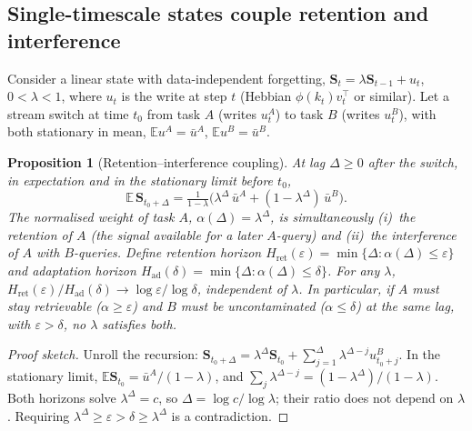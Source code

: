 \documentclass[11pt]{article}
\newtheorem{proposition}{Proposition}
\theoremstyle{remark}
\newcommand{\Sm}{\mathbf{S}}
\begin{document}
\subsection{Single-timescale states couple retention and interference}
\label{sec:coupling}

Consider a linear state with data-independent forgetting, $\Sm_t=\lambda\Sm_{t-1}+u_t$, $0<\lambda<1$, where $u_t$
is the write at step $t$ (Hebbian $\phi(k_t)v_t^\top$ or similar). Let a stream switch at time $t_0$ from task $A$
(writes $u^A_t$) to task $B$ (writes $u^B_t$), with both stationary in mean, $\mathbb{E}u^A=\bar u^A$,
$\mathbb{E}u^B=\bar u^B$.

\begin{proposition}[Retention--interference coupling]
\label{prop:coupling}
At lag $\Delta\ge0$ after the switch, in expectation and in the stationary limit before $t_0$,
\[
\mathbb{E}\,\Sm_{t_0+\Delta}=\tfrac{1}{1-\lambda}\big(\lambda^{\Delta}\,\bar u^A+(1-\lambda^{\Delta})\,\bar u^B\big).
\]
The normalised weight of task $A$, $\alpha(\Delta)=\lambda^\Delta$, is simultaneously (i)~the \emph{retention} of
$A$ (the signal available for a later $A$-query) and (ii)~the \emph{interference} of $A$ with $B$-queries. Define
retention horizon $H_{\mathrm{ret}}(\varepsilon)=\min\{\Delta:\alpha(\Delta)\le\varepsilon\}$ and adaptation horizon
$H_{\mathrm{ad}}(\delta)=\min\{\Delta:\alpha(\Delta)\le\delta\}$. For any $\lambda$,
$H_{\mathrm{ret}}(\varepsilon)/H_{\mathrm{ad}}(\delta)\to\log\varepsilon/\log\delta$, independent of $\lambda$.
In particular, if $A$ must stay retrievable ($\alpha\ge\varepsilon$) and $B$ must be uncontaminated
($\alpha\le\delta$) at the same lag, with $\varepsilon>\delta$, no $\lambda$ satisfies both.
\end{proposition}
\begin{proof}[Proof sketch]
Unroll the recursion: $\Sm_{t_0+\Delta}=\lambda^\Delta\Sm_{t_0}+\sum_{j=1}^{\Delta}\lambda^{\Delta-j}u^B_{t_0+j}$.
In the stationary limit, $\mathbb{E}\Sm_{t_0}=\bar u^A/(1-\lambda)$, and $\sum_{j}\lambda^{\Delta-j}=(1-\lambda^\Delta)/(1-\lambda)$.
Both horizons solve $\lambda^\Delta=c$, so $\Delta=\log c/\log\lambda$; their ratio does not depend on $\lambda$.
Requiring $\lambda^\Delta\ge\varepsilon>\delta\ge\lambda^\Delta$ is a contradiction.
\end{proof}
\end{document}
